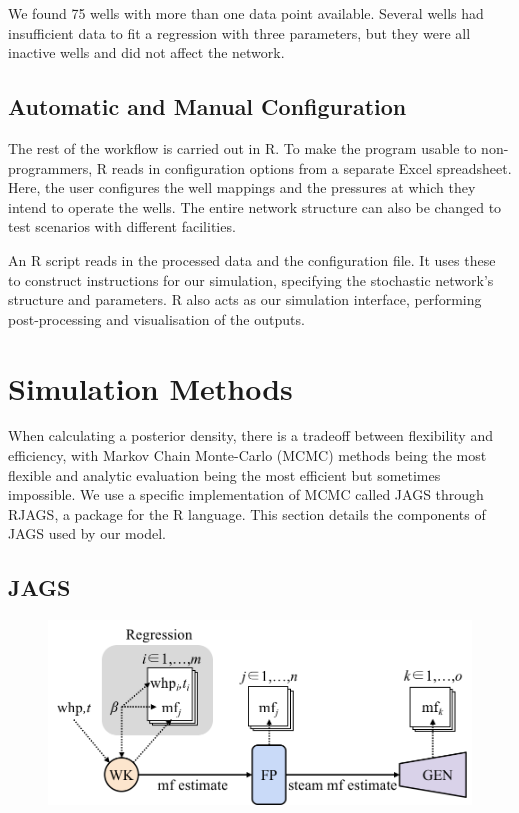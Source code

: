 \documentclass[a4paper, 12pt]{article}
\begin{document}
We found 75 wells with more than one data point available. Several wells had insufficient data to fit a regression with three parameters, but they were all inactive wells and did not affect the network.

\subsection{Automatic and Manual Configuration}
The rest of the workflow is carried out in R. To make the program usable to non-programmers, R reads in configuration options from a separate Excel spreadsheet. Here, the user configures the well mappings and the pressures at which they intend to operate the wells. The entire network structure can also be changed to test scenarios with different facilities.

An R script reads in the processed data and the configuration file. It uses these to construct instructions for our simulation, specifying the stochastic network's structure and parameters. R also acts as our simulation interface, performing post-processing and visualisation of the outputs.

\section{Simulation Methods}
When calculating a posterior density, there is a tradeoff between flexibility and efficiency, with Markov Chain Monte-Carlo (MCMC) methods being the most flexible and analytic evaluation being the most efficient but sometimes impossible. We use a specific implementation of MCMC called JAGS through RJAGS, a package for the R language. This section details the components of JAGS used by our model.

\subsection{JAGS}

\begin{figure}
  \centering
  \includegraphics[width=0.5\linewidth]{media/jags_diagram}
  \label{fig:jags_diagram}
\end{figure}
\end{document}
